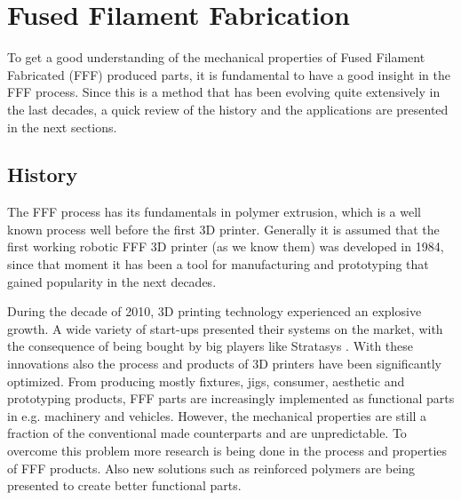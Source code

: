 \section{Fused Filament Fabrication}
    \label{Fused Filament Fabrication}

To get a good understanding of the mechanical properties of Fused Filament Fabricated (FFF) produced parts, it is fundamental to have a good insight in the FFF process. Since this is a method that has been evolving quite extensively in the last decades, a quick review of the history and the applications are presented in the next sections. 

\subsection{History}
    \label{History}
The FFF process has its fundamentals in polymer extrusion, which is a well known process well before the first 3D printer. Generally it is assumed that the first working robotic FFF 3D printer (as we know them) was developed in 1984, since that moment it has been a tool for manufacturing and prototyping that gained popularity in the next decades. 

During the decade of 2010, 3D printing technology experienced an explosive growth. A wide variety of start-ups presented their systems on the market, with the consequence of being bought by big players like Stratasys \cite{Kamran2016ATechnology}. With these innovations also the process and products of 3D printers have been significantly optimized. From producing mostly fixtures, jigs, consumer, aesthetic and prototyping products, FFF parts are increasingly implemented as functional parts in e.g. machinery and vehicles. However, the mechanical properties are still a fraction of the conventional made counterparts and are unpredictable. To overcome this problem more research is being done in the process and properties of FFF products. Also new solutions such as reinforced polymers are being presented to create better functional parts. 

